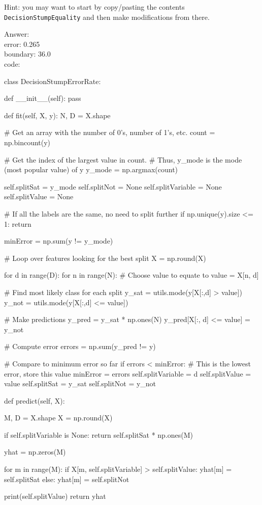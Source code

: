 \documentclass{article}
\def\ans#1{\par\gre{Answer: #1}}
\def\gre#1{{\color{gre}#1}}
\begin{document}
Hint: you may want to start by copy/pasting the contents \texttt{DecisionStumpEquality} and then make modifications from there. 
\ans{\\
	error: 0.265\\
	boundary: 36.0\\
	code:
}
\begin{python}
	class DecisionStumpErrorRate:
	
	def __init__(self):
	pass
	
	
	def fit(self, X, y):
	N, D = X.shape
	
	# Get an array with the number of 0's, number of 1's, etc.
	count = np.bincount(y)    
	
	# Get the index of the largest value in count.  
	# Thus, y_mode is the mode (most popular value) of y
	y_mode = np.argmax(count) 
	
	self.splitSat = y_mode
	self.splitNot = None
	self.splitVariable = None
	self.splitValue = None
	
	# If all the labels are the same, no need to split further
	if np.unique(y).size <= 1:
	return
	
	minError = np.sum(y != y_mode)
	
	# Loop over features looking for the best split
	X = np.round(X)
	
	for d in range(D):
	for n in range(N):
	# Choose value to equate to
	value = X[n, d]
	
	# Find most likely class for each split
	y_sat = utils.mode(y[X[:,d] > value])
	y_not = utils.mode(y[X[:,d] <= value])
	
	# Make predictions
	y_pred = y_sat * np.ones(N)
	y_pred[X[:, d] <= value] = y_not
	
	# Compute error
	errors = np.sum(y_pred != y)
	
	# Compare to minimum error so far
	if errors < minError:
	# This is the lowest error, store this value
	minError = errors
	self.splitVariable = d
	self.splitValue = value
	self.splitSat = y_sat
	self.splitNot = y_not
	
	def predict(self, X):
	
	M, D = X.shape
	X = np.round(X)
	
	if self.splitVariable is None:
	return self.splitSat * np.ones(M)
	
	yhat = np.zeros(M)
	
	for m in range(M):
	if X[m, self.splitVariable] > self.splitValue:
	yhat[m] = self.splitSat
	else:
	yhat[m] = self.splitNot
	
	print(self.splitValue)
	return yhat
\end{python}
\end{document}
